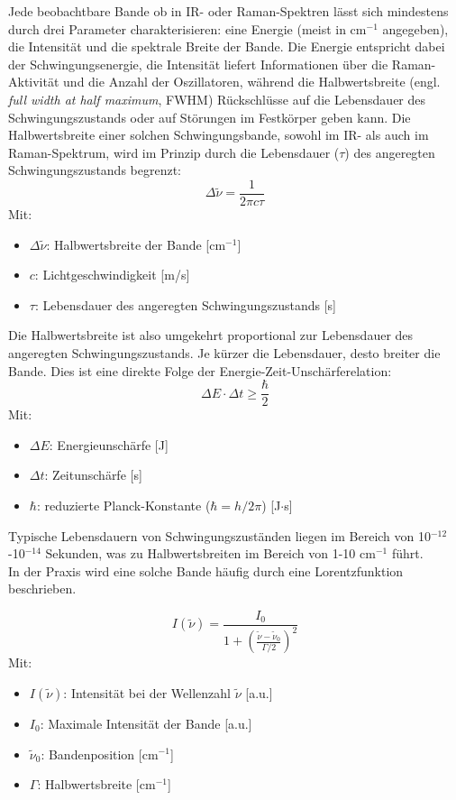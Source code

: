 Jede beobachtbare Bande ob in IR- oder Raman-Spektren lässt sich mindestens durch drei Parameter charakterisieren: eine Energie (meist in cm$^{-1}$ angegeben), 
die Intensität und die spektrale Breite der Bande. Die Energie entspricht dabei der Schwingungsenergie, die Intensität liefert Informationen über die Raman-Aktivität und die Anzahl der Oszillatoren, 
während die Halbwertsbreite (engl. \textit{full width at half maximum}, FWHM) Rückschlüsse auf die Lebensdauer des Schwingungszustands oder auf Störungen im Festkörper geben kann. 
Die Halbwertsbreite einer solchen Schwingungsbande, sowohl im IR- als auch im Raman-Spektrum, wird im Prinzip durch die Lebensdauer ($\tau$) des angeregten Schwingungszustands begrenzt:
\begin{equation}
    \Delta\tilde{\nu} = \frac{1}{2\pi c\tau}
\end{equation}
Mit:
\begin{itemize}
    \item $\Delta\tilde{\nu}$: Halbwertsbreite der Bande [cm$^{-1}$]
    \item $c$: Lichtgeschwindigkeit [m/s]
    \item $\tau$: Lebensdauer des angeregten Schwingungszustands [s]
\end{itemize}
Die Halbwertsbreite ist also umgekehrt proportional zur Lebensdauer des angeregten Schwingungszustands. Je kürzer die Lebensdauer, desto breiter die Bande. Dies 
ist eine direkte Folge der Energie-Zeit-Unschärferelation:
\begin{equation}
    \Delta E \cdot \Delta t \geq \frac{\hbar}{2}
\end{equation}
Mit:
\begin{itemize}
    \item $\Delta E$: Energieunschärfe [J]
    \item $\Delta t$: Zeitunschärfe [s]
    \item $\hbar$: reduzierte Planck-Konstante ($\hbar = h/2\pi$) [J$\cdot$s]
\end{itemize}

Typische Lebensdauern von Schwingungszuständen liegen im Bereich von 10$^{-12}$-10$^{-14}$ Sekunden, was zu Halbwertsbreiten im Bereich von 1-10 cm$^{-1}$ führt.\\
In der Praxis wird eine solche Bande häufig durch eine Lorentzfunktion beschrieben.

\begin{equation}
    I(\tilde{\nu}) = \frac{I_0}{1 + \left(\frac{\tilde{\nu} - \tilde{\nu}_0}{\Gamma/2}\right)^2}
\end{equation}
Mit:
\begin{itemize}
    \item $I(\tilde{\nu})$: Intensität bei der Wellenzahl $\tilde{\nu}$ [a.u.]
    \item $I_0$: Maximale Intensität der Bande [a.u.]
    \item $\tilde{\nu}_0$: Bandenposition  [cm$^{-1}$]
    \item $\Gamma$: Halbwertsbreite [cm$^{-1}$]
\end{itemize}

